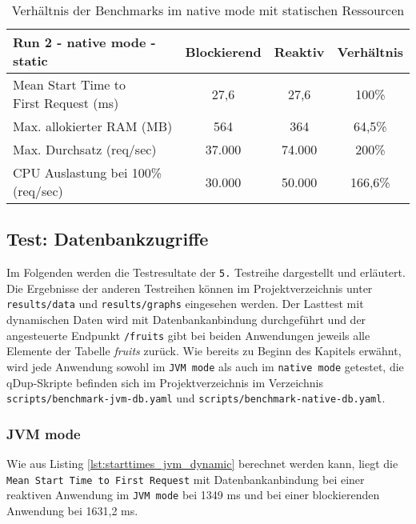 \begin{table}[ht!]
  \begin{tabular}{|l | c | c | c|}
    \hline
    Run 2 - native mode - static & Blockierend & Reaktiv & Verhältnis \\
    \hline
    \makecell[l]{Mean Start Time to                                   \\ First Request (ms)} &   27,6    &  27,6  &   100\%   \\
    \hline
    Max. allokierter RAM (MB)    & 564         & 364     & 64,5\%     \\
    \hline
    Max. Durchsatz (req/sec)     & 37.000      & 74.000  & 200\%      \\
    \hline
    \makecell[l]{CPU Auslastung bei 100\%                             \\ (req/sec)} & 30.000 & 50.000 & 166,6\%  \\
    \hline
  \end{tabular}
  \caption{Verhältnis der Benchmarks im native mode mit statischen Ressourcen}
  \label{table:static_native_measurement_results}
\end{table}
\newpage
\subsection{Test: Datenbankzugriffe}
\label{section:datenbankzugriffe}
Im Folgenden werden die Testresultate der \verb|5.| Testreihe dargestellt und erläutert.
Die Ergebnisse der anderen Testreihen können im Projektverzeichnis unter \verb|results/data| und \verb|results/graphs| eingesehen werden.
Der Lasttest mit dynamischen Daten wird mit Datenbankanbindung durchgeführt und der angesteuerte Endpunkt \verb|/fruits| gibt bei beiden Anwendungen
jeweils alle Elemente der Tabelle \textit{fruits} zurück. Wie bereits zu Beginn des Kapitels erwähnt, wird jede Anwendung sowohl im \verb|JVM mode| als auch im
\verb|native mode| getestet, die qDup-Skripte befinden sich im Projektverzeichnis im Verzeichnis \verb|scripts/benchmark-jvm-db.yaml| und
\verb|scripts/benchmark-native-db.yaml|.

\subsubsection{JVM mode}
\label{subsubsec:dynamic_jvm_mode}
Wie aus Listing \ref{lst:starttimes_jvm_dynamic} berechnet werden kann, liegt die \verb|Mean Start Time to First Request|
mit Datenbankanbindung bei einer reaktiven Anwendung im \verb|JVM mode| bei 1349 ms und bei einer
blockierenden Anwendung bei 1631,2 ms.

